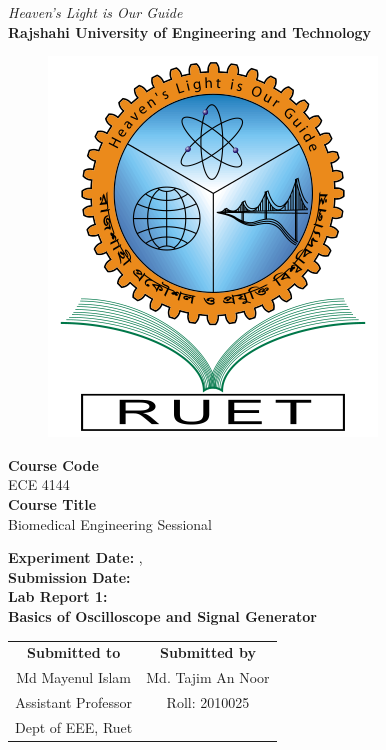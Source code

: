 \vspace*{\fill}
\begin{center}

    \emph{Heaven's Light is Our Guide} \\
    \textbf{Rajshahi University of Engineering and Technology} \\

    \begin{figure}[H]
        \centering
        \includegraphics[scale=.34]{images/RUET_logo.png}
        \label{fig:ruet_logo}
    \end{figure}
    \vspace{5mm}

    \textbf{Course Code}\\
    ECE 4144\\
    \vspace{3mm}
    \textbf{Course Title}\\
    Biomedical Engineering Sessional

    \vspace{5mm}
    \textbf{Experiment Date:} {},\\
    \textbf{Submission Date:} {}\\

    \vspace{5mm}
    \textbf{Lab Report 1: \\
        Basics of Oscilloscope and Signal Generator}

    \vspace{15mm}

    \begin{tabular}{c|c}
        \textbf{Submitted to} & \textbf{Submitted by} \\
        Md Mayenul Islam      & Md. Tajim An Noor     \\
        Assistant Professor   & Roll: 2010025         \\
        Dept of EEE, Ruet     &                       \\
    \end{tabular}

\end{center}
\vspace*{\fill}
